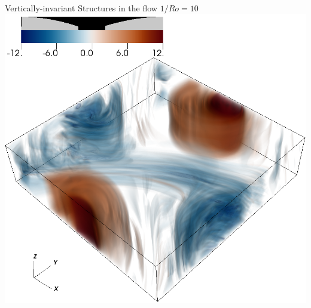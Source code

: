 \documentclass[aspecttatio=169]{beamer}
\begin{document}
\begin{frame}{Vertically-invariant Structures in the flow}
    \emp
        \centering
        $1/Ro = 10$
        \includegraphics[width=.95\textwidth]{images/vortz_Om10_vr2.png}
    \emp
\end{frame}
\end{document}
